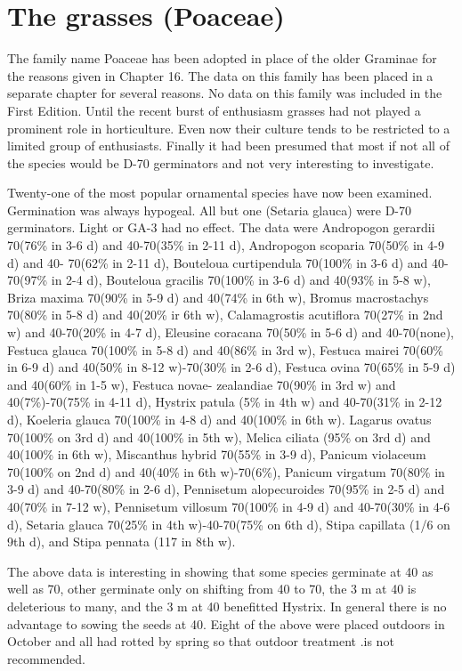\chapter{The grasses (Poaceae)}

The family name Poaceae has been adopted in place of the older Graminae for
the reasons given in Chapter 16. The data on this family has been placed in a
separate chapter for several reasons. No data on this family was included in the First
Edition. Until the recent burst of enthusiasm grasses had not played a prominent role
in horticulture. Even now their culture tends to be restricted to a limited group of
enthusiasts. Finally it had been presumed that most if not all of the species would be
D-70 germinators and not very interesting to investigate.

Twenty-one of the most popular ornamental species have now been examined.
Germination was always hypogeal. All but one (Setaria glauca) were D-70
germinators. Light or GA-3 had no effect. The data were Andropogon gerardii 70(76\%
in 3-6 d) and 40-70(35\% in 2-11 d), Andropogon scoparia 70(50\% in 4-9 d) and 40-
70(62\% in 2-11 d), Bouteloua curtipendula 70(100\% in 3-6 d) and 40-70(97\% in 2-4
d), Bouteloua gracilis 70(100\% in 3-6 d) and 40(93\% in 5-8 w), Briza maxima 70(90\%
in 5-9 d) and 40(74\% in 6th w), Bromus macrostachys 70(80\% in 5-8 d) and 40(20\% ir
6th w), Calamagrostis acutiflora 70(27\% in 2nd w) and 40-70(20\% in 4-7 d), Eleusine
coracana 70(50\% in 5-6 d) and 40-70(none), Festuca glauca 70(100\% in 5-8 d) and
40(86\% in 3rd w), Festuca mairei 70(60\% in 6-9 d) and 40(50\% in 8-12 w)-70(30\% in
2-6 d), Festuca ovina 70(65\% in 5-9 d) and 40(60\% in 1-5 w), Festuca novae-
zealandiae 70(90\% in 3rd w) and 40(7\%)-70(75\% in 4-11 d), Hystrix patula (5\% in 4th
w) and 40-70(31\% in 2-12 d), Koeleria glauca 70(100\% in 4-8 d) and 40(100\% in 6th
w). Lagarus ovatus 70(100\% on 3rd d) and 40(100\% in 5th w), Melica ciliata (95\% on
3rd d) and 40(100\% in 6th w), Miscanthus hybrid 70(55\% in 3-9 d), Panicum
violaceum 70(100\% on 2nd d) and 40(40\% in 6th w)-70(6\%), Panicum virgatum
70(80\% in 3-9 d) and 40-70(80\% in 2-6 d), Pennisetum alopecuroides 70(95\% in 2-5
d) and 40(70\% in 7-12 w), Pennisetum villosum 70(100\% in 4-9 d) and 40-70(30\% in
4-6 d), Setaria glauca 70(25\% in 4th w)-40-70(75\% on 6th d), Stipa capillata (1/6 on
9th d), and Stipa pennata (117 in 8th w).

The above data is interesting in showing that some species germinate at 40
as well as 70, other germinate only on shifting from 40 to 70, the 3 m at 40 is
deleterious to many, and the 3 m at 40 benefitted Hystrix. In general there is no
advantage to sowing the seeds at 40. Eight of the above were placed outdoors in
October and all had rotted by spring so that outdoor treatment .is not recommended.

